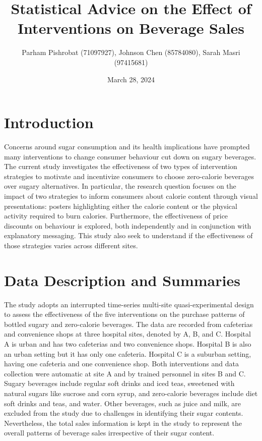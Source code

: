 \documentclass[
]{article}
\title{Statistical Advice on the Effect of Interventions on Beverage Sales}
\author{Parham Pishrobat (71097927), Johnson Chen (85784080), Sarah Masri (97415681)}
\date{March 28, 2024}
\begin{document}
\maketitle

{
\setcounter{tocdepth}{2}
\tableofcontents
}
\pagebreak

\hypertarget{introduction}{%
\section{Introduction}\label{introduction}}

Concerns around sugar consumption and its health implications have prompted many interventions to change consumer behaviour cut down on sugary beverages. The current study investigates the effectiveness of two types of intervention strategies to motivate and incentivize consumers to choose zero-calorie beverages over sugary alternatives. In particular, the research question focuses on the impact of two strategies to inform consumers about calorie content through visual presentations: posters highlighting either the calorie content or the physical activity required to burn calories. Furthermore, the effectiveness of price discounts on behaviour is explored, both independently and in conjunction with explanatory messaging. This study also seek to understand if the effectiveness of those strategies varies across different sites.

\hypertarget{data-description-and-summaries}{%
\section{Data Description and Summaries}\label{data-description-and-summaries}}

The study adopts an interrupted time-series multi-site quasi-experimental design to assess the effectiveness of the five interventions on the purchase patterns of bottled sugary and zero-calorie beverages. The data are recorded from cafeterias and convenience shops at three hospital sites, denoted by A, B, and C. Hospital A is urban and has two cafeterias and two convenience shops. Hospital B is also an urban setting but it has only one cafeteria. Hospital C is a suburban setting, having one cafeteria and one convenience shop. Both interventions and data collection were automatic at site A and by trained personnel in sites B and C. Sugary beverages include regular soft drinks and iced teas, sweetened with natural sugars like sucrose and corn syrup, and zero-calorie beverages include diet soft drinks and teas, and water. Other beverages, such as juice and milk, are excluded from the study due to challenges in identifying their sugar contents. Nevertheless, the total sales information is kept in the study to represent the overall patterns of beverage sales irrespective of their sugar content.
\end{document}
